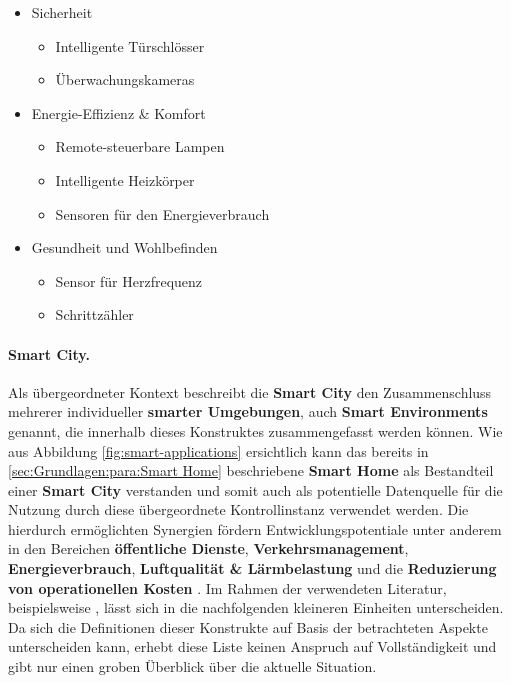 \begin{itemize}
	\item Sicherheit
		\begin{itemize}
			\item Intelligente Türschlösser
			\item Überwachungskameras
		\end{itemize}
	\item Energie-Effizienz \& Komfort
		\begin{itemize}
			\item Remote-steuerbare Lampen
			\item Intelligente Heizkörper
			\item Sensoren für den Energieverbrauch
		\end{itemize}
	\item Gesundheit und Wohlbefinden
		\begin{itemize}
			\item Sensor für Herzfrequenz
			\item Schrittzähler
		\end{itemize}
\end{itemize}

\paragraph{Smart City.}
\label{sec:Grundlagen:para:Smart City}
Als übergeordneter Kontext beschreibt die \textbf{Smart City} den Zusammenschluss mehrerer individueller \textbf{smarter Umgebungen}, auch \textbf{Smart Environments} genannt, die innerhalb dieses Konstruktes zusammengefasst werden können. Wie aus Abbildung \ref{fig:smart-applications} ersichtlich kann das bereits in \ref{sec:Grundlagen:para:Smart Home} beschriebene \textbf{Smart Home} als Bestandteil einer \textbf{Smart City} verstanden und somit auch als potentielle Datenquelle für die Nutzung durch diese übergeordnete Kontrollinstanz verwendet werden. Die hierdurch ermöglichten Synergien fördern Entwicklungspotentiale unter anderem in den Bereichen \textbf{öffentliche Dienste}, \textbf{Verkehrsmanagement}, \textbf{Energieverbrauch}, \textbf{Luftqualität \& Lärmbelastung} und die \textbf{Reduzierung von operationellen Kosten} \cite{Bastos2018}.
Im Rahmen der verwendeten Literatur, beispielsweise \cite{Bastos2018,Cui2018,SecPrivSmartCity2021}, lässt sich in die nachfolgenden kleineren Einheiten unterscheiden. Da sich die Definitionen dieser Konstrukte auf Basis der betrachteten Aspekte unterscheiden kann, erhebt diese Liste keinen Anspruch auf Vollständigkeit und gibt nur einen groben Überblick über die aktuelle Situation.


